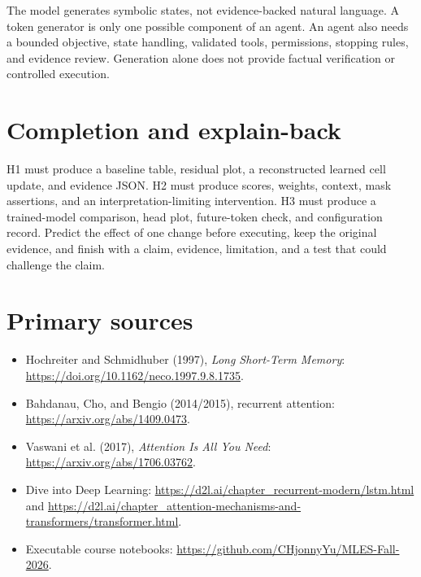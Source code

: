 \documentclass[11pt,oneside]{book}
\begin{document}
The model generates symbolic states, not evidence-backed natural language.
A token generator is only one possible component of an agent. An agent
also needs a bounded objective, state handling, validated tools,
permissions, stopping rules, and evidence review. Generation alone does
not provide factual verification or controlled execution.

\section{Completion and explain-back}
H1 must produce a baseline table, residual plot, a reconstructed learned
cell update, and evidence JSON. H2 must produce scores, weights, context,
mask assertions, and an interpretation-limiting intervention. H3 must
produce a trained-model comparison, head plot, future-token check, and
configuration record. Predict the effect of one change before executing,
keep the original evidence, and finish with a claim, evidence, limitation,
and a test that could challenge the claim.

\section{Primary sources}
\begin{itemize}
\item Hochreiter and Schmidhuber (1997), \emph{Long Short-Term Memory}:
\url{https://doi.org/10.1162/neco.1997.9.8.1735}.
\item Bahdanau, Cho, and Bengio (2014/2015), recurrent attention:
\url{https://arxiv.org/abs/1409.0473}.
\item Vaswani et al. (2017), \emph{Attention Is All You Need}:
\url{https://arxiv.org/abs/1706.03762}.
\item Dive into Deep Learning:
\url{https://d2l.ai/chapter_recurrent-modern/lstm.html} and
\url{https://d2l.ai/chapter_attention-mechanisms-and-transformers/transformer.html}.
\item Executable course notebooks:
\url{https://github.com/CHjonnyYu/MLES-Fall-2026}.
\end{itemize}
\end{document}
